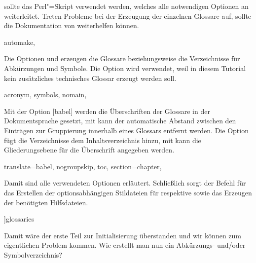 \documentclass[%
  english,ngerman,%
  geometry=no,DIV=12,automark,%
]{tudscrartcl}
\begin{document}
sollte das Perl"=Skript  verwendet werden, welches 
alle notwendigen Optionen an  weiterleitet. Treten Probleme 
bei der Erzeugung der einzelnen Glossare auf, sollte die Dokumentation von 
 weiterhelfen können.
%
\begin{Preamble}
  automake,%
\end{Preamble}
%
Die Optionen  und  erzeugen die Glossare 
beziehungsweise die Verzeichnisse für Abkürzungen und Symbole. Die Option  
 wird verwendet, weil in diesem Tutorial kein zusätzliches 
technisches Glossar erzeugt werden soll.
%
\begin{Preamble}
    acronym,%
    symbols,%
    nomain,%
\end{Preamble}
%
Mit der Option [babel] werden die Überschriften der Glossare 
in der Dokumentsprache gesetzt, mit  kann der automatische 
Abstand zwischen den Einträgen zur Gruppierung innerhalb eines Glossars 
entfernt werden. Die Option  fügt die Verzeichnisse dem 
Inhaltsverzeichnis hinzu, mit  kann die Gliederungsebene für 
die Überschrift angegeben werden.
%
\begin{Preamble}
  translate=babel,%
  nogroupskip,%
  toc,%
  section=chapter,%
\end{Preamble}
%
Damit sind alle verwendeten Optionen erläutert. Schließlich sorgt der Befehl 
 für das Erstellen der optionsabhängigen Stildateien für 
 respektive  sowie das Erzeugen der 
benötigten Hilfsdateien.
%
\begin{Preamble}
]{glossaries}
\makeglossaries

\end{Preamble}
%
Damit wäre der erste Teil zur Initialisierung überstanden und wir können zum 
eigentlichen Problem kommen. Wie erstellt man nun ein Abkürzungs- und/oder 
Symbolverzeichnis?
\end{document}
